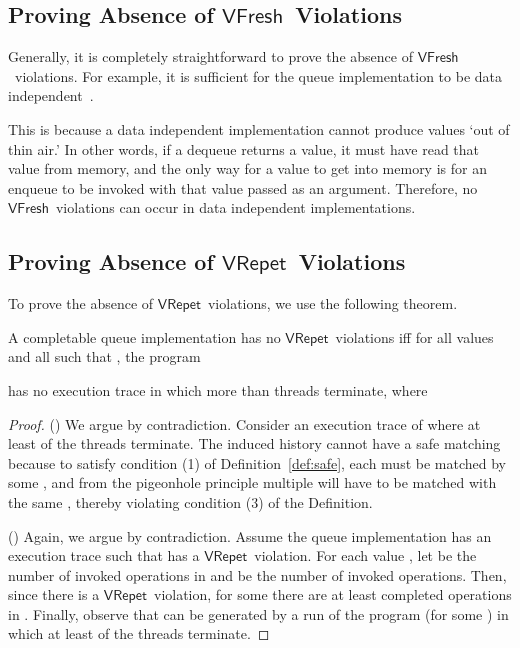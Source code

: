\documentclass{LMCS}
\newcommand{\VFresh}{\ensuremath{\mathsf{VFresh}}}
\newcommand{\VRepet}{\ensuremath{\mathsf{VRepet}}}
\begin{document}
\subsection*{Proving Absence of \VFresh\ Violations}

Generally, it is completely straightforward to prove the absence of \VFresh\
violations.  For example, it is sufficient for the queue implementation to be
data independent~\cite{WP1986}.

This is because a data independent implementation cannot produce values `out of
thin air.' In other words, if a dequeue returns a value, it must have read that
value from memory, and the only way for a value to get into memory is for an
enqueue to be invoked with that value passed as an argument.  Therefore, no
\VFresh\ violations can occur in data independent implementations.




\subsection*{Proving Absence of \VRepet\ Violations}

To prove the absence of \VRepet\ violations, we use the following theorem. 

\begin{thm}\label{thm:vrepet}
A completable queue implementation has no \VRepet\ violations iff 
for all values  and all  such that , the program

has no execution trace in which more than   threads terminate, where

\end{thm}

\begin{proof}
()
We argue by contradiction.
Consider an execution trace  of  where at least  of the  threads terminate.
The induced history  cannot have a safe matching because to satisfy condition (1) of
Definition~\ref{def:safe}, each  must be matched by some ,
and from the pigeonhole principle multiple  will have to be matched
with the same , 
thereby violating condition (3) of the Definition.

()
Again, we argue by contradiction.
Assume the queue implementation has an execution trace  such that  has a \VRepet\ violation. 
For each value , 
let  be the number of invoked  operations in  
and  be the number of invoked  operations.
Then, since there is a \VRepet\ violation, for some  there are at least 
 completed  operations in .
Finally, observe that  can be generated by a run of the program 
(for some ) in which at least  of the  threads terminate.
\end{proof}
\end{document}
